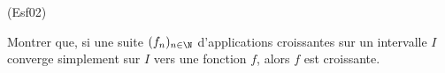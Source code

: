 \begin{tiny}(Esf02)\end{tiny} Montrer que, si une suite $(f_n)_{n\in\N}$  d'applications croissantes sur un intervalle $I$ converge
  simplement sur $I$ vers une fonction $f$, alors $f$ est croissante.